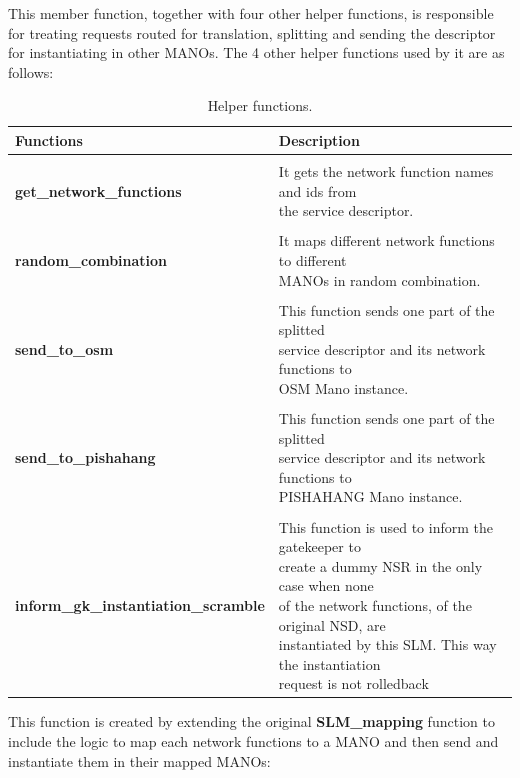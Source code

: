 This member function, together with four other helper functions, is responsible for treating requests routed for translation, splitting and sending the descriptor for instantiating in other MANOs. The 4 other helper functions used by it are as follows:
\begin{table}[h!]
	\begin{center}
		\caption{Helper functions.}
		\label{tab:table2}
		\begin{tabular}{l|l} %
			\textbf{Functions} & \textbf{Description} \\
			\hline\\
			\textbf{get\_network\_functions} & \makecell[l]{It gets the network function names and ids from \\ the service descriptor.} \\\\
			\textbf{random\_combination} & \makecell[l]{It maps different network functions to different \\ MANOs in random combination.}  \\\\
			\textbf{send\_to\_osm} & \makecell[l]{This function sends one part of the splitted \\ service descriptor and its network functions to \\OSM Mano instance.} \\\\
			\textbf{send\_to\_pishahang} & \makecell[l]{This function sends one part of the splitted \\ service descriptor and its network functions to \\ PISHAHANG Mano instance.}\\\\
			\textbf{inform\_gk\_instantiation\_scramble} & \makecell[l]{This function is used to inform the gatekeeper to \\ create a dummy NSR in the only case when none \\ of the network functions, of the original NSD, are \\ instantiated by this SLM. This way the instantiation \\ request is not rolledback}
		\end{tabular}
	\end{center}
\end{table}

This function is created by extending the original \textbf{SLM\_mapping} function to include the logic to map each network functions to a MANO and then send and instantiate them in their mapped MANOs:

